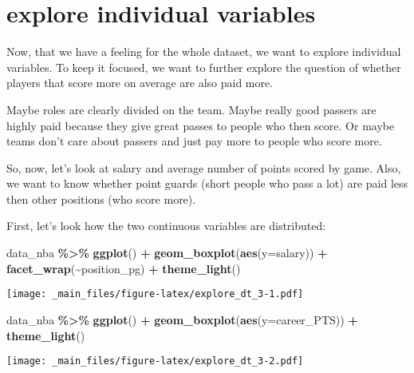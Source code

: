 \documentclass[
]{book}
\newenvironment{Shaded}{\begin{snugshade}}{\end{snugshade}}
\newcommand{\AttributeTok}[1]{\textcolor[rgb]{0.13,0.29,0.53}{#1}}
\newcommand{\FunctionTok}[1]{\textcolor[rgb]{0.13,0.29,0.53}{\textbf{#1}}}
\newcommand{\NormalTok}[1]{#1}
\newcommand{\SpecialCharTok}[1]{\textcolor[rgb]{0.81,0.36,0.00}{\textbf{#1}}}
\begin{document}
\hypertarget{explore-individual-variables}{%
\section{explore individual variables}\label{explore-individual-variables}}

Now, that we have a feeling for the whole dataset, we want to explore individual
variables. To keep it focused, we want to further explore the question
of whether players that score more on average are also paid more.

Maybe roles are clearly divided on the team. Maybe really good passers are highly
paid because they give great passes to people who then score. Or maybe teams
don't care about passers and just pay more to people who score more.

So, now, let's look at salary and average number of points scored by game.
Also, we want to know whether point guards (short people who pass a lot) are
paid less then other positions (who score more).

First, let's look how the two continuous variables are distributed:

\begin{Shaded}
\begin{Highlighting}[]
\NormalTok{data\_nba }\SpecialCharTok{\%\textgreater{}\%} \FunctionTok{ggplot}\NormalTok{() }\SpecialCharTok{+} 
\FunctionTok{geom\_boxplot}\NormalTok{(}\FunctionTok{aes}\NormalTok{(}\AttributeTok{y=}\NormalTok{salary)) }\SpecialCharTok{+}
  \FunctionTok{facet\_wrap}\NormalTok{(}\SpecialCharTok{\textasciitilde{}}\NormalTok{position\_pg) }\SpecialCharTok{+}
  \FunctionTok{theme\_light}\NormalTok{()}
\end{Highlighting}
\end{Shaded}

\texttt{[image: \_main\_files/figure-latex/explore\_dt\_3-1.pdf]}

\begin{Shaded}
\begin{Highlighting}[]
\NormalTok{data\_nba }\SpecialCharTok{\%\textgreater{}\%} \FunctionTok{ggplot}\NormalTok{() }\SpecialCharTok{+} 
\FunctionTok{geom\_boxplot}\NormalTok{(}\FunctionTok{aes}\NormalTok{(}\AttributeTok{y=}\NormalTok{career\_PTS)) }\SpecialCharTok{+} 
  \FunctionTok{theme\_light}\NormalTok{()}
\end{Highlighting}
\end{Shaded}

\texttt{[image: \_main\_files/figure-latex/explore\_dt\_3-2.pdf]}
\end{document}
